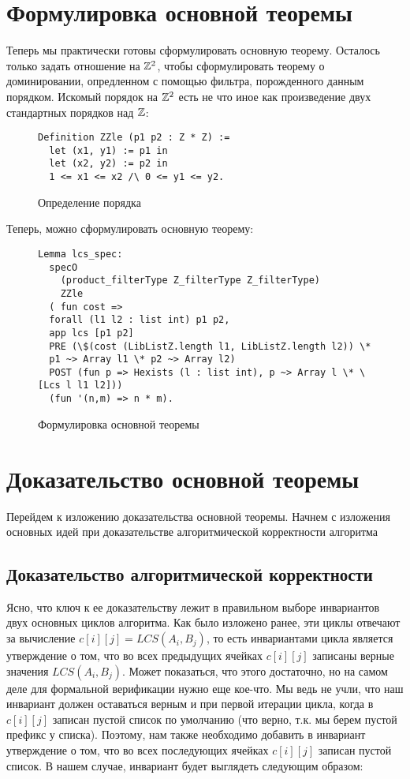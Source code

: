 \section{Формулировка основной теоремы}
Теперь мы практически готовы сформулировать основную теорему. Осталось только задать отношение на $\mathbb{Z}^2$, чтобы сформулировать
теорему о доминировании, опредленном с помощью фильтра, порожденного данным порядком. Искомый порядок на $\mathbb{Z}^2$ есть не что иное как
произведение двух стандартных порядков над $\mathbb{Z}$:

\begin{figure}[H]
  \caption{Определение порядка}
  \label{code:filter_definition}
  \begin{verbatim}
Definition ZZle (p1 p2 : Z * Z) :=
  let (x1, y1) := p1 in
  let (x2, y2) := p2 in
  1 <= x1 <= x2 /\ 0 <= y1 <= y2.
  \end{verbatim}
\end{figure}

Теперь, можно сформулировать основную теорему:
\begin{figure}[H]
  \caption{Формулировка основной теоремы}
  \label{code:main_result_definition}
  \begin{verbatim}
Lemma lcs_spec:
  specO
    (product_filterType Z_filterType Z_filterType)
    ZZle
  ( fun cost =>
  forall (l1 l2 : list int) p1 p2,
  app lcs [p1 p2]
  PRE (\$(cost (LibListZ.length l1, LibListZ.length l2)) \*
  p1 ~> Array l1 \* p2 ~> Array l2)
  POST (fun p => Hexists (l : list int), p ~> Array l \* \[Lcs l l1 l2]))
  (fun '(n,m) => n * m).
  \end{verbatim}
\end{figure}


\section{Доказательство основной теоремы}
Перейдем к изложению доказательства основной теоремы. Начнем с изложения основных идей при доказательстве алгоритмической корректности
алгоритма
\subsection{Доказательство алгоритмической корректности}
Ясно, что ключ к ее доказательству лежит в правильном выборе инвариантов
двух основных циклов алгоритма. Как было изложено ранее, эти циклы отвечают за вычисление $c[i][j] = LCS(A_i, B_j)$, то есть
инвариантами цикла является утверждение о том, что во всех предыдущих ячейках $c[i][j]$ записаны верные значения $LCS(A_i, B_j)$.
Может показаться, что этого достаточно, но на самом деле для формальной верификации нужно еще кое-что. Мы ведь не учли, что наш инвариант
должен оставаться верным и при первой итерации цикла, когда в $c[i][j]$ записан пустой список по умолчанию
(что верно, т.к. мы берем пустой префикс у списка). Поэтому, нам также необходимо добавить в инвариант утверждение о том, что во
всех последующих ячейках $c[i][j]$ записан пустой список. В нашем случае, инвариант будет выглядеть следующим образом:

